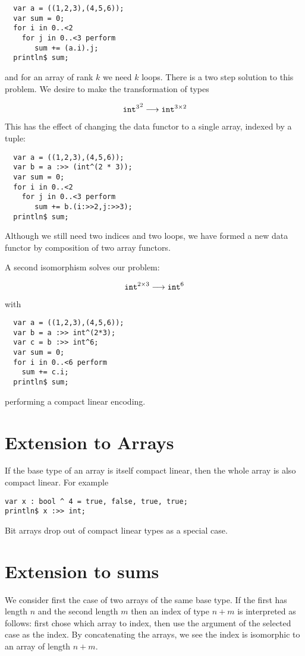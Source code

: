 \documentclass{article}
\begin{document}
\begin{verbatim}
  var a = ((1,2,3),(4,5,6));
  var sum = 0;
  for i in 0..<2 
    for j in 0..<3 perform 
       sum += (a.i).j;
  println$ sum;
\end{verbatim}

and for an array of rank $k$ we need $k$ loops. There is a two 
step solution to this problem. We desire to make the transformation
of types

$${{\tt int}^3}^2 \longrightarrow 
{\tt int} ^ {3 \times 2}$$

This has the effect of changing the data functor to a single
array, indexed by a tuple:

\begin{verbatim}
  var a = ((1,2,3),(4,5,6));
  var b = a :>> (int^(2 * 3));
  var sum = 0;
  for i in 0..<2
    for j in 0..<3 perform
       sum += b.(i:>>2,j:>>3);
  println$ sum;
\end{verbatim}

Although we still need two indices and two loops, we have
formed a new data functor by composition of two array functors.

A second isomorphism solves our problem:

$$ {\tt int} ^ {2 \times 3} \longrightarrow {\tt int} ^ 6 $$

with

\begin{verbatim}
  var a = ((1,2,3),(4,5,6));
  var b = a :>> int^(2*3);
  var c = b :>> int^6;
  var sum = 0;
  for i in 0..<6 perform
    sum += c.i;
  println$ sum;
\end{verbatim}

performing a compact linear encoding.

\section{Extension to Arrays}
If the base type of an array is itself compact linear,
then the whole array is also compact linear. For example

\begin{verbatim}
var x : bool ^ 4 = true, false, true, true;
println$ x :>> int; 
\end{verbatim}

Bit arrays drop out of compact linear types as a special case.

\section{Extension to sums}
We consider first the case of two arrays of the
same base type. If the first has length $n$ and the second length $m$
then an index of type $n+m$ is interpreted as follows: first chose
which array to index, then use the argument of the selected case
as the index. By concatenating the arrays, we see the index is
isomorphic to an array of length $n+m$.
\end{document}
